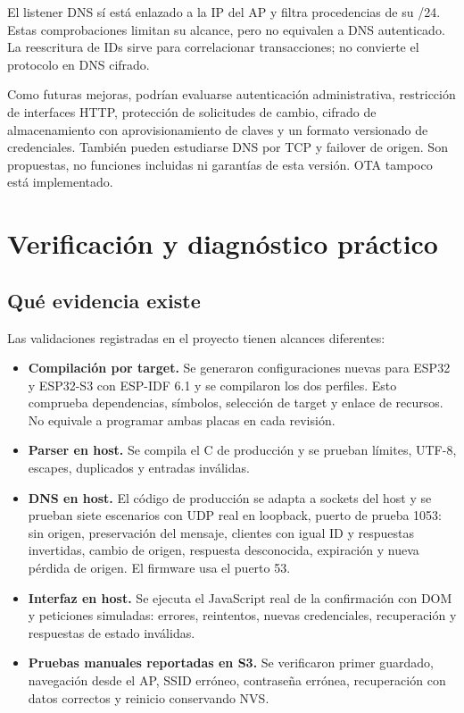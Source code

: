 \documentclass[11pt,a4paper]{article}
\begin{document}
El listener DNS sí está enlazado a la IP del AP y filtra procedencias
de su /24. Estas comprobaciones limitan su alcance, pero no equivalen
a DNS autenticado. La reescritura de IDs sirve para correlacionar
transacciones; no convierte el protocolo en DNS cifrado.

Como futuras mejoras, podrían evaluarse autenticación administrativa,
restricción de interfaces HTTP, protección de solicitudes de cambio,
cifrado de almacenamiento con aprovisionamiento de claves y un formato
versionado de credenciales. También pueden estudiarse DNS por TCP y
failover de origen. Son propuestas, no funciones incluidas ni garantías
de esta versión. OTA tampoco está implementado.

\section{Verificación y diagnóstico práctico}
\label{sec:verificacion}

\subsection{Qué evidencia existe}

Las validaciones registradas en el proyecto tienen alcances diferentes:
\begin{itemize}
  \item \textbf{Compilación por target.} Se generaron configuraciones
  nuevas para ESP32 y ESP32-S3 con ESP-IDF 6.1 y se compilaron los dos
  perfiles. Esto comprueba dependencias, símbolos, selección de target
  y enlace de recursos. No equivale a programar ambas placas en cada revisión.
  \item \textbf{Parser en host.} Se compila el C de producción y se prueban
  límites, UTF-8, escapes, duplicados y entradas inválidas.
  \item \textbf{DNS en host.} El código de producción se adapta a sockets
  del host y se prueban siete escenarios con UDP real en loopback, puerto
  de prueba 1053: sin origen, preservación del mensaje, clientes con igual
  ID y respuestas invertidas, cambio de origen, respuesta desconocida,
  expiración y nueva pérdida de origen. El firmware usa el puerto 53.
  \item \textbf{Interfaz en host.} Se ejecuta el JavaScript real de la
  confirmación con DOM y peticiones simuladas: errores, reintentos, nuevas
  credenciales, recuperación y respuestas de estado inválidas.
  \item \textbf{Pruebas manuales reportadas en S3.} Se verificaron primer
  guardado, navegación desde el AP, SSID erróneo, contraseña errónea,
  recuperación con datos correctos y reinicio conservando NVS.
\end{itemize}
\end{document}
